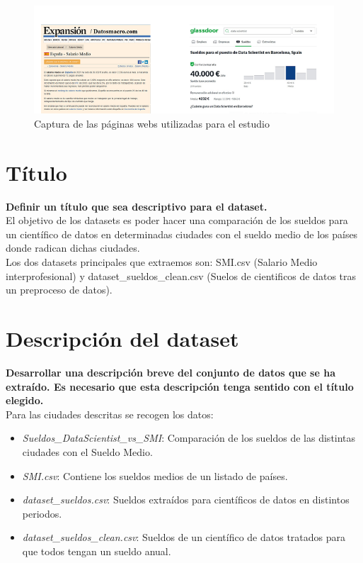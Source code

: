 \documentclass[IB]{PlantillaPACnova_Est}
\begin{document}
\begin{figure}[h]
\includegraphics{fuentes.png}
\caption{Captura de las páginas webs utilizadas para el estudio}
\end{figure}

\newpage 
\section{Título}
\textbf{Definir un título que sea descriptivo para el dataset.} \\

El objetivo de los datasets es poder hacer una comparación de los sueldos para un científico de datos en determinadas ciudades con el sueldo medio de los países donde radican dichas ciudades.\\

Los dos datasets principales que extraemos son: SMI.csv (Salario Medio interprofesional) y dataset\_sueldos\_clean.csv (Suelos de cientificos de datos tras un preproceso de datos).

\section{Descripción del dataset}
\textbf{Desarrollar una descripción breve del conjunto de datos que se ha extraído. Es necesario que esta descripción tenga sentido con el título elegido.} \\

Para las ciudades descritas se recogen los datos:
\begin{itemize}
\item \textit{Sueldos\_DataScientist\_vs\_SMI}: Comparación de los sueldos de las distintas ciudades con el Sueldo Medio.
\item \textit{SMI.csv}: Contiene los sueldos medios de un listado de países.
\item \textit{dataset\_sueldos.csv}: Sueldos extraídos para científicos de datos en distintos periodos.
\item \textit{dataset\_sueldos\_clean.csv}: Sueldos de un científico de datos tratados para que todos tengan un sueldo anual.
\end{itemize}
\end{document}
